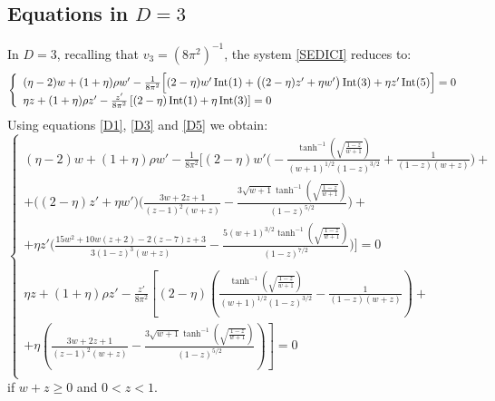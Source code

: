 \subsection{Equations in $D=3$}
In $D=3$, recalling that $v_3 = (8\pi^2)^{-1}$, the system \eqref{SEDICI} reduces to:
\begin{equation}
\left\{
\begin{array}{l}
 (\eta -2)w + (1 +\eta){\rho} w' - \frac{1}{8\pi^2}\Big[(2-\eta)w'\operatorname{Int}(1) + \big((2-\eta)z' + \eta w'\big)\operatorname{Int}(3) + \eta z'\operatorname{Int}(5)\Big] = 0\\
\eta {z} + (1+\eta)\rho z'  - \frac{z'}{8\pi^2} \left[(2 - \eta)\operatorname{Int}(1) + \eta \operatorname{Int}(3)\right] = 0\\
\end{array}
\right.
\end{equation}
Using equations \eqref{D1}, \eqref{D3} and \eqref{D5} we obtain:
\begin{displaymath}
\left\{
\begin{array}{l}

(\eta -2)w + (1 +\eta){\rho} w' - \frac{1}{8\pi^2}\Bigg[(2-\eta)w'\Big(-\frac{\tanh ^{-1}\left(\sqrt{\frac{1-z}{w+1}}\right)}{(w+1)^{1/2} (1-z)^{3/2}}+\frac{1}{(1-z) (w+z)}\Big) +\\
+\big((2-\eta)z' + \eta w'\big)\Big( \frac{3 w+2 z+1}{(z-1)^2 (w+z)}-\frac{3 \sqrt{w+1} \tanh ^{-1}\left(\sqrt{\frac{1-z}{w+1}}\right)}{(1-z)^{5/2}}\Big) +\\
+ \eta z'\Big(\frac{15 w^2+10 w (z+2)-2 (z-7) z+3}{3 (1-z)^3 (w+z)}-\frac{5 (w+1)^{3/2} \tanh ^{-1}\left(\sqrt{\frac{1-z}{w+1}}\right)}{(1-z)^{7/2}}\Big)\Bigg] = 0\\
\\\eta {z} + (1+\eta)\rho{z'}  - \frac{{z'}}{8\pi^2} \left[(2 - \eta) \left(\frac{\tanh ^{-1}\left(\sqrt{\frac{1-z}{w+1}}\right)}{(w+1)^{1/2} (1-z)^{3/2}}-\frac{1}{(1-z) (w+z)}\right) + \right. \\ 
+\left.  \eta \left(\frac{3 w+2 z+1}{(z-1)^2 (w+z)}-\frac{3 \sqrt{w+1} \tanh ^{-1}\left(\sqrt{\frac{1-z}{w+1}}\right)}{(1-z)^{5/2}}\right)\right] = 0\\
\end{array}
\right.
\end{displaymath}
if $ w + z \geq 0$ and $0<z<1$.

